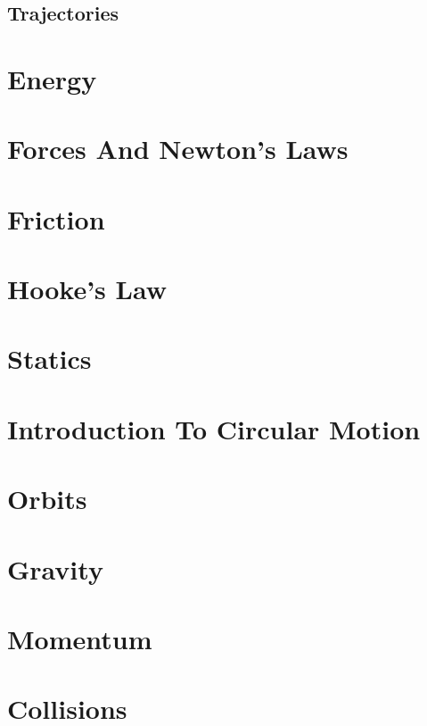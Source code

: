 \documentclass[letterpaper,12pt]{article}
\begin{document}
\subsection{Trajectories}\label{sec:trajectories}

\section{Energy}\label{Energy}

\section{Forces And Newton's Laws}\label{Force}

\section{Friction}\label{Friction}

\section{Hooke's Law}\label{Hooke}

\section{Statics}\label{Statics}

\section{Introduction To Circular Motion}\label{Circular}

\section{Orbits}\label{Orbits}

\section{Gravity}\label{Gravity}

\section{Momentum}\label{Momentum}

\section{Collisions}\label{Collisions}




\appendix



\end{document}
